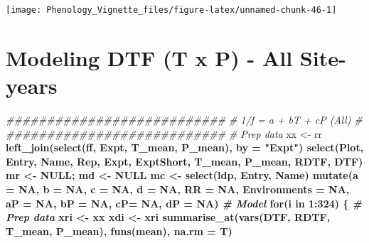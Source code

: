 \documentclass[
]{article}
\newenvironment{Shaded}{\begin{snugshade}}{\end{snugshade}}
\newcommand{\CommentTok}[1]{\textcolor[rgb]{0.56,0.35,0.01}{\textit{#1}}}
\newcommand{\ControlFlowTok}[1]{\textcolor[rgb]{0.13,0.29,0.53}{\textbf{#1}}}
\newcommand{\DataTypeTok}[1]{\textcolor[rgb]{0.13,0.29,0.53}{#1}}
\newcommand{\DecValTok}[1]{\textcolor[rgb]{0.00,0.00,0.81}{#1}}
\newcommand{\KeywordTok}[1]{\textcolor[rgb]{0.13,0.29,0.53}{\textbf{#1}}}
\newcommand{\NormalTok}[1]{#1}
\newcommand{\OperatorTok}[1]{\textcolor[rgb]{0.81,0.36,0.00}{\textbf{#1}}}
\newcommand{\OtherTok}[1]{\textcolor[rgb]{0.56,0.35,0.01}{#1}}
\newcommand{\StringTok}[1]{\textcolor[rgb]{0.31,0.60,0.02}{#1}}
\begin{document}
\texttt{[image: Phenology\_Vignette\_files/figure-latex/unnamed-chunk-46-1]}

\hypertarget{modeling-dtf-t-x-p---all-site-years}{%
\section{Modeling DTF (T x P) - All
Site-years}\label{modeling-dtf-t-x-p---all-site-years}}

\begin{Shaded}
\begin{Highlighting}[]
\CommentTok{###########################}
\CommentTok{# 1/f = a + bT + cP (All) #}
\CommentTok{###########################}
\CommentTok{# Prep data}
\NormalTok{xx <-}\StringTok{ }\NormalTok{rr }\OperatorTok{%
\StringTok{  }\KeywordTok{left_join}\NormalTok{(}\KeywordTok{select}\NormalTok{(ff, Expt, T_mean, P_mean), }\DataTypeTok{by =} \StringTok{"Expt"}\NormalTok{) }\OperatorTok{%
\StringTok{  }\KeywordTok{select}\NormalTok{(Plot, Entry, Name, Rep, Expt, ExptShort, T_mean, P_mean, RDTF, DTF)}
\NormalTok{mr <-}\StringTok{ }\OtherTok{NULL}\NormalTok{; md <-}\StringTok{ }\OtherTok{NULL}
\NormalTok{mc <-}\StringTok{ }\KeywordTok{select}\NormalTok{(ldp, Entry, Name) }\OperatorTok{%
\StringTok{  }\KeywordTok{mutate}\NormalTok{(}\DataTypeTok{a =} \OtherTok{NA}\NormalTok{, }\DataTypeTok{b =} \OtherTok{NA}\NormalTok{, }\DataTypeTok{c =} \OtherTok{NA}\NormalTok{, }\DataTypeTok{d =} \OtherTok{NA}\NormalTok{, }\DataTypeTok{RR =} \OtherTok{NA}\NormalTok{, }\DataTypeTok{Environments =} \OtherTok{NA}\NormalTok{,}
         \DataTypeTok{aP =} \OtherTok{NA}\NormalTok{, }\DataTypeTok{bP =} \OtherTok{NA}\NormalTok{, }\DataTypeTok{cP=} \OtherTok{NA}\NormalTok{, }\DataTypeTok{dP =} \OtherTok{NA}\NormalTok{)}
\CommentTok{# Model}
\ControlFlowTok{for}\NormalTok{(i }\ControlFlowTok{in} \DecValTok{1}\OperatorTok{:}\DecValTok{324}\NormalTok{) \{}
  \CommentTok{# Prep data}
\NormalTok{  xri <-}\StringTok{ }\NormalTok{xx }\OperatorTok{%
\NormalTok{  xdi <-}\StringTok{ }\NormalTok{xri }\OperatorTok{%
\StringTok{    }\KeywordTok{summarise_at}\NormalTok{(}\KeywordTok{vars}\NormalTok{(DTF, RDTF, T_mean, P_mean), }\KeywordTok{funs}\NormalTok{(mean), }\DataTypeTok{na.rm =}\NormalTok{ T) }\OperatorTok{%
}}}}}}
\end{Highlighting}
\end{Shaded}
\end{document}
